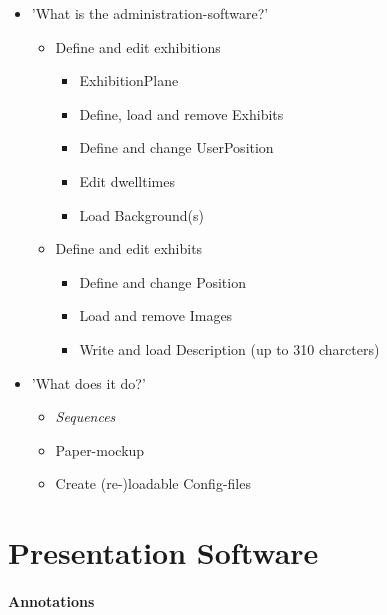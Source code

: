 \begin{itemize}
	\item 'What is the administration-software?'
	\begin{itemize}
		\item Define and edit exhibitions
		\begin{itemize}
			\item ExhibitionPlane
			\item Define, load and remove Exhibits
			\item Define and change UserPosition
			\item Edit dwelltimes
			\item Load Background(s)
		\end{itemize}
		\item Define and edit exhibits
		\begin{itemize}
			\item Define and change Position
			\item Load and remove Images
			\item Write and load Description (up to 310 charcters)
		\end{itemize}
	\end{itemize}
	\item 'What does it do?'
	\begin{itemize}
		\item \textit{Sequences}
		\item Paper-mockup
		\item Create (re-)loadable Config-files
	\end{itemize}
\end{itemize}


\section{Presentation Software}
\label{implementation_presentation}

\paragraph{Annotations}


